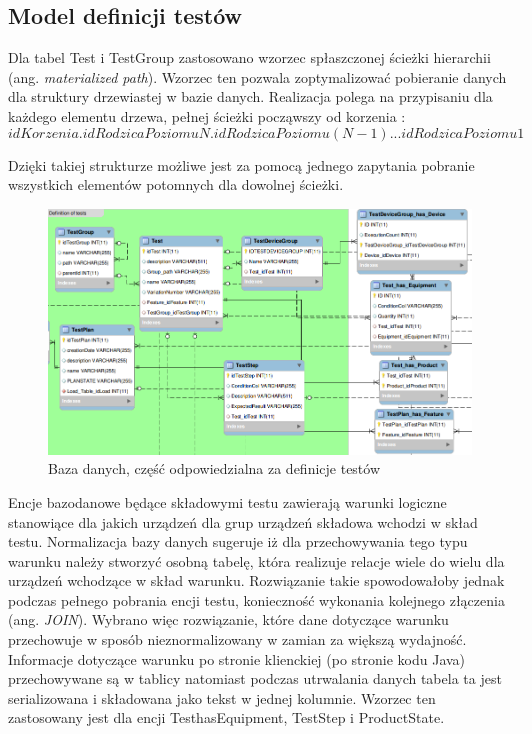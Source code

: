  

  
 \subsection{Model definicji testów}   


 Dla tabel Test i TestGroup zastosowano wzorzec spłaszczonej ścieżki hierarchii\cite{materializedPath} (ang.\textit{ materialized path}). Wzorzec ten pozwala zoptymalizować pobieranie danych dla struktury drzewiastej w bazie danych. Realizacja polega na przypisaniu dla każdego elementu drzewa, pełnej ścieżki począwszy od korzenia :
 \begin{equation}
{idKorzenia}.{idRodzicaPoziomuN}.{idRodzicaPoziomu(N-1)}...{idRodzicaPoziomu1}
\end{equation}
  
  Dzięki takiej strukturze możliwe jest za pomocą jednego zapytania pobranie wszystkich elementów potomnych dla dowolnej ścieżki.
    \begin{figure}[h]
\centerline{\includegraphics[scale=0.5]{img/bazaDanychDefinicja.png}}
 \label{fig:bazaTesty}
      \caption{Baza danych, część odpowiedzialna za definicje testów}
\end{figure}
  Encje bazodanowe będące składowymi testu zawierają warunki logiczne stanowiące dla jakich urządzeń dla grup urządzeń składowa wchodzi w skład testu. Normalizacja bazy danych sugeruje iż dla przechowywania tego typu warunku należy stworzyć osobną tabelę, która realizuje relacje wiele do wielu dla urządzeń wchodzące w skład warunku. Rozwiązanie takie spowodowałoby jednak podczas pełnego pobrania encji testu, konieczność wykonania kolejnego złączenia (ang. \textit{JOIN}). Wybrano więc rozwiązanie, które dane dotyczące warunku przechowuje w sposób nieznormalizowany w zamian za większą wydajność. Informacje dotyczące warunku po stronie klienckiej (po stronie kodu Java) przechowywane są w tablicy natomiast podczas utrwalania danych tabela ta jest serializowana i składowana jako tekst w jednej kolumnie. Wzorzec ten zastosowany jest dla encji TesthasEquipment, TestStep i ProductState.

